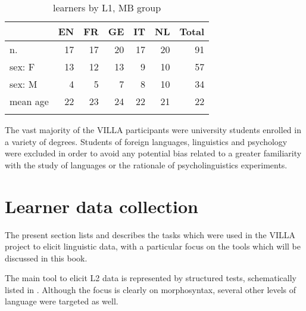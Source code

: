 \begin{table}
    \begin{tabularx}{.66\textwidth}{Xrrrrrr}
    \lsptoprule
         & EN & FR & GE & IT & NL & Total\\
    \midrule
        n. & 17 & 17 & 20 & 17 & 20 & 91\\
        sex: F & 13 & 12 & 13 & 9 & 10 & 57\\
        sex: M & 4 & 5 & 7 & 8 & 10 & 34\\
        mean age & 22 & 23 & 24 & 22 & 21 & 22\\
    \lspbottomrule
    \end{tabularx}
    \caption{learners by L1, MB group}
    \label{tab:02:8}
\end{table}

The vast majority of the VILLA participants were university students enrolled in a variety of degrees. Students of foreign languages, linguistics and psychology were excluded in order to avoid any potential bias related to a greater familiarity with the study of languages or the rationale of psycholinguistics experiments.

\section{Learner data collection}\label{sec:02:4}
\largerpage
The present section lists and describes the tasks which were used in the VILLA project to elicit linguistic data, with a particular focus on the tools which will be discussed in this book.

The main tool to elicit L2 data is represented by structured tests, schematically listed in . Although the focus is clearly on morphosyntax, several other levels of language were targeted as well.

